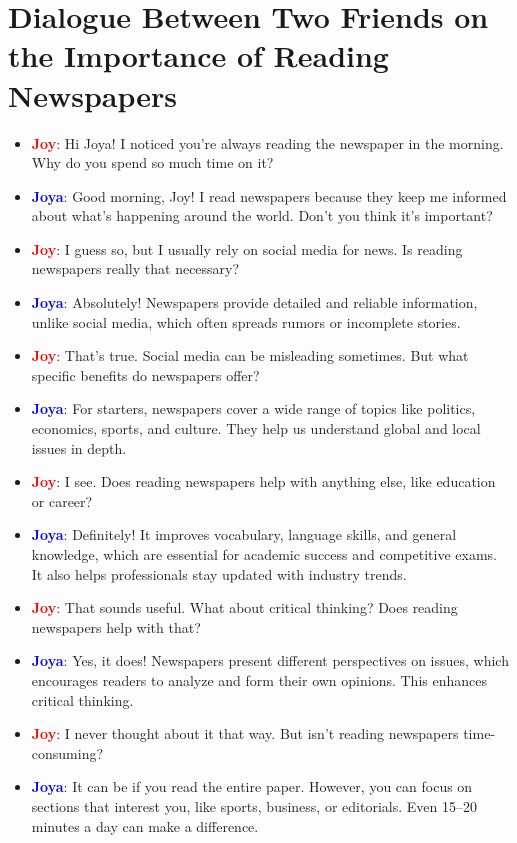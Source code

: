 \documentclass{article}
\begin{document}
\section*{Dialogue Between Two Friends on the Importance of Reading Newspapers}
\begin{itemize}
    \item \textbf{\textcolor{red}{Joy}}: Hi Joya! I noticed you’re always reading the newspaper in the morning. Why do you spend so much time on it?
    \item \textbf{\textcolor{blue}{Joya}}: Good morning, Joy! I read newspapers because they keep me informed about what’s happening around the world. Don’t you think it’s important?
    \item \textbf{\textcolor{red}{Joy}}: I guess so, but I usually rely on social media for news. Is reading newspapers really that necessary?
    \item \textbf{\textcolor{blue}{Joya}}: Absolutely! Newspapers provide detailed and reliable information, unlike social media, which often spreads rumors or incomplete stories.
    \item \textbf{\textcolor{red}{Joy}}: That’s true. Social media can be misleading sometimes. But what specific benefits do newspapers offer?
    \item \textbf{\textcolor{blue}{Joya}}: For starters, newspapers cover a wide range of topics like politics, economics, sports, and culture. They help us understand global and local issues in depth.
    \item \textbf{\textcolor{red}{Joy}}: I see. Does reading newspapers help with anything else, like education or career?
    \item \textbf{\textcolor{blue}{Joya}}: Definitely! It improves vocabulary, language skills, and general knowledge, which are essential for academic success and competitive exams. It also helps professionals stay updated with industry trends.
    \item \textbf{\textcolor{red}{Joy}}: That sounds useful. What about critical thinking? Does reading newspapers help with that?
    \item \textbf{\textcolor{blue}{Joya}}: Yes, it does! Newspapers present different perspectives on issues, which encourages readers to analyze and form their own opinions. This enhances critical thinking.
    \item \textbf{\textcolor{red}{Joy}}: I never thought about it that way. But isn’t reading newspapers time-consuming?
    \item \textbf{\textcolor{blue}{Joya}}: It can be if you read the entire paper. However, you can focus on sections that interest you, like sports, business, or editorials. Even 15–20 minutes a day can make a difference.

\end{itemize}
\end{document}
